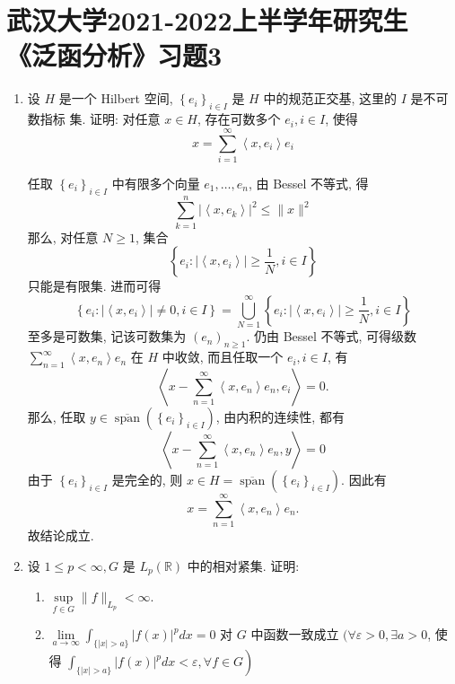 \section{武汉大学2021-2022上半学年研究生
《泛函分析》习题3}
\begin{enumerate}
    \item 设 $H$ 是一个 Hilbert 空间, $\left\{e_{i}\right\}_{i \in I}$ 是 $H$ 中的规范正交基, 这里的 $I$ 是不可数指标 集. 证明: 对任意 $x \in H$, 存在可数多个 $e_{i}, i \in I$, 使得
    \[
    x=\sum_{i=1}^{\infty}\left\langle x, e_{i}\right\rangle e_{i}
    \]
    \begin{answer}
        任取 $\left\{e_{i}\right\}_{i \in I}$ 中有限多个向量 $e_{1}, \ldots, e_{n}$, 由 Bessel 不等式, 得
        \[
        \sum_{k=1}^{n}\left|\left\langle x, e_{k}\right\rangle\right|^{2} \leq\|x\|^{2}
        \]
        那么, 对任意 $N \geq 1$, 集合
        \[
        \left\{e_{i}:\left|\left\langle x, e_{i}\right\rangle\right| \geq \frac{1}{N}, i \in I\right\}
        \]
        只能是有限集. 进而可得
        \[
        \left\{e_{i}:\left|\left\langle x, e_{i}\right\rangle\right| \neq  0, i \in I\right\}=\bigcup_{N=1}^{\infty}\left\{e_{i}:\left|\left\langle x, e_{i}\right\rangle\right| \geq \frac{1}{N}, i \in I\right\}
        \]
        至多是可数集, 记该可数集为 $\left(e_{n}\right)_{n \geq 1}$. 仍由 Bessel 不等式, 可得级数 $\sum_{n=1}^{\infty}\left\langle x, e_{n}\right\rangle e_{n}$ 在 $H$ 中收敛, 而且任取一个 $e_{i}, i \in I$, 有
        \[
        \left\langle x-\sum_{n=1}^{\infty}\left\langle x, e_{n}\right\rangle e_{n}, e_{i}\right\rangle=0 .
        \]
        那么, 任取 $y \in \overline{\operatorname{span}}\left(\left\{e_{i}\right\}_{i \in I}\right)$, 由内积的连续性, 都有
        \[
        \left\langle x-\sum_{n=1}^{\infty}\left\langle x, e_{n}\right\rangle e_{n}, y\right\rangle=0
        \]
        由于 $\left\{e_{i}\right\}_{i \in I}$ 是完全的, 则 $x \in H=\overline{\operatorname{span}}\left(\left\{e_{i}\right\}_{i \in I}\right)$. 因此有
        $$
        x=\sum_{n=1}^{\infty}\left\langle x, e_{n}\right\rangle e_{n} .
        $$
        故结论成立.
    \end{answer}
    \item 设 $1 \leq p<\infty, G$ 是 $L_{p}(\mathbb{R})$ 中的相对紧集. 证明:
        \begin{enumerate}
            \item $\sup \limits_{f \in G}\|f\|_{L_{p}}<\infty$.
            \item\label{problem:homework3-2-2} $\lim \limits_{a \to \infty} \int_{\{|x|>a\}}|f(x)|^{p} d x=0$ 对 $G$ 中函数一致成立 $(\forall \varepsilon>0, \exists a>0$, 使得 $\left.\int_{\{|x|>a\}}|f(x)|^{p} d x<\varepsilon, \forall f \in G\right)$

\end{enumerate}
\end{enumerate}
